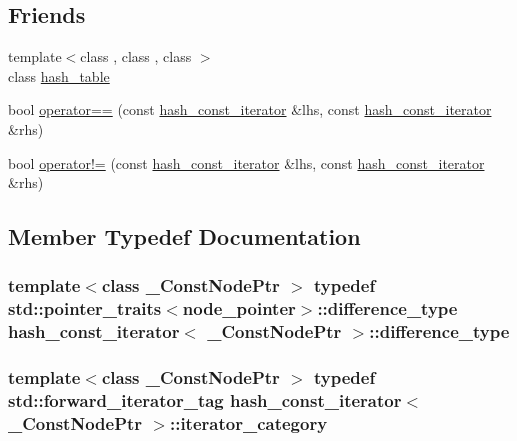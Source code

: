 \subsection*{Friends}
\begin{DoxyCompactItemize}
\item 
{\footnotesize template$<$class , class , class $>$ }\\class \hyperlink{classhash__const__iterator_a39f140c37d8ec7b0c08b23083c94562e}{hash\+\_\+table}
\item 
bool \hyperlink{classhash__const__iterator_a96827d3783f52f606cedc4964e0fb36c}{operator==} (const \hyperlink{classhash__const__iterator}{hash\+\_\+const\+\_\+iterator} \&lhs, const \hyperlink{classhash__const__iterator}{hash\+\_\+const\+\_\+iterator} \&rhs)
\item 
bool \hyperlink{classhash__const__iterator_abcafacdc1290952a19dd7aefa032daef}{operator!=} (const \hyperlink{classhash__const__iterator}{hash\+\_\+const\+\_\+iterator} \&lhs, const \hyperlink{classhash__const__iterator}{hash\+\_\+const\+\_\+iterator} \&rhs)
\end{DoxyCompactItemize}


\subsection{Member Typedef Documentation}
\hypertarget{classhash__const__iterator_a59ea10fb6033eb3ec9ac819e781d8f3a}{}
\subsubsection[{difference\+\_\+type}]{\setlength{\rightskip}{0pt plus 5cm}template$<$class \+\_\+\+Const\+Node\+Ptr $>$ typedef std\+::pointer\+\_\+traits$<$node\+\_\+pointer$>$\+::{\bf difference\+\_\+type} {\bf hash\+\_\+const\+\_\+iterator}$<$ \+\_\+\+Const\+Node\+Ptr $>$\+::{\bf difference\+\_\+type}}\label{classhash__const__iterator_a59ea10fb6033eb3ec9ac819e781d8f3a}
\hypertarget{classhash__const__iterator_aa4c49734f4b5370ed6e8bc14be74c79d}{}
\subsubsection[{iterator\+\_\+category}]{\setlength{\rightskip}{0pt plus 5cm}template$<$class \+\_\+\+Const\+Node\+Ptr $>$ typedef std\+::forward\+\_\+iterator\+\_\+tag {\bf hash\+\_\+const\+\_\+iterator}$<$ \+\_\+\+Const\+Node\+Ptr $>$\+::{\bf iterator\+\_\+category}}\label{classhash__const__iterator_aa4c49734f4b5370ed6e8bc14be74c79d}
\hypertarget{classhash__const__iterator_ab4441e734185e334b2b02f49f83af048}{}
